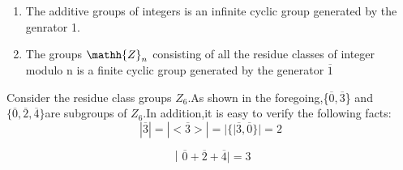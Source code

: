\documentclass[cn,10pt,math=newtx,citestyle=gb7714-2015,bibstyle=gb7714-2015]{elegantbook}
\begin{document}
\begin{example}
\begin{enumerate}
    \item     The additive groups of integers is an  infinite cyclic group generated by the genrator 1.
    \item The groups $\mathh{Z}_n$ consisting of all the residue classes of integer modulo n is a finite cyclic group generated by the generator  $\overline{1}$
\end{enumerate}
\end{example}
\begin{example}
    Consider the residue class groups $Z_6$.As shown in the foregoing,\{$\overline{0},\overline{3}$\} and $\{\overline{0},\overline{2},\overline{4}\}$are subgroups of $Z_6$.In addition,it is easy to verify the following facts:
\begin{equation*}
|\overline{3}|=|<\overline{3}>|=|\{|\overline{3},\overline{0}\}|=2
\end{equation*}

\begin{equation*}      
  ｜\overline{0}+\overline{2}+\overline{4}|=3
\end{equation*}
\end{example}
\end{document}
